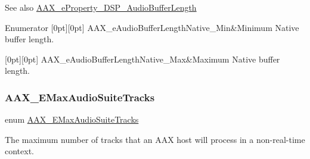 \begin{DoxySeeAlso}{See also}
\mbox{\hyperlink{a00662_a13e384f22825afd3db6d68395b79ce0da09fbd1cbcae0e86ad81005258dc1b67e}{A\+A\+X\+\_\+e\+Property\+\_\+\+D\+S\+P\+\_\+\+Audio\+Buffer\+Length}} 
\end{DoxySeeAlso}
\begin{DoxyEnumFields}{Enumerator}
[0pt][0pt]{}\mbox{\label{a00491_aa1769ee466fd07659d8c7ef5ac61cd49a5819a4956c053084b094f686c920598e}} 
A\+A\+X\+\_\+e\+Audio\+Buffer\+Length\+Native\+\_\+\+Min&Minimum Native buffer length. \\
\hline

[0pt][0pt]{}\mbox{\label{a00491_aa1769ee466fd07659d8c7ef5ac61cd49aa325b1b2fa11f722ae4491e236617441}} 
A\+A\+X\+\_\+e\+Audio\+Buffer\+Length\+Native\+\_\+\+Max&Maximum Native buffer length. \\
\hline

\end{DoxyEnumFields}
\mbox{\label{a00491_af94bcc724bc9a54eb8a83a664c0b1b48}} 
\subsubsection{\texorpdfstring{AAX\_EMaxAudioSuiteTracks}{AAX\_EMaxAudioSuiteTracks}}
{\footnotesize\ttfamily enum \mbox{\hyperlink{a00491_af94bcc724bc9a54eb8a83a664c0b1b48}{A\+A\+X\+\_\+\+E\+Max\+Audio\+Suite\+Tracks}}}



The maximum number of tracks that an A\+AX host will process in a non-\/real-\/time context. 


